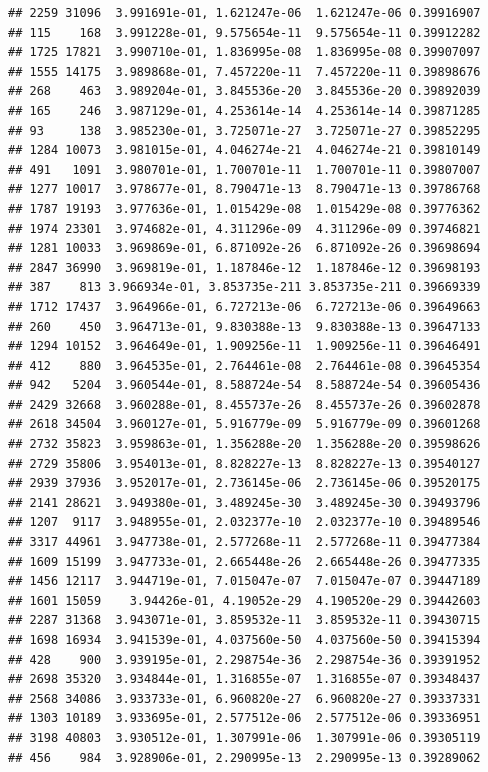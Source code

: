 \documentclass[
]{article}
\begin{document}
\begin{verbatim}
## 2259 31096  3.991691e-01, 1.621247e-06  1.621247e-06 0.39916907
## 115    168  3.991228e-01, 9.575654e-11  9.575654e-11 0.39912282
## 1725 17821  3.990710e-01, 1.836995e-08  1.836995e-08 0.39907097
## 1555 14175  3.989868e-01, 7.457220e-11  7.457220e-11 0.39898676
## 268    463  3.989204e-01, 3.845536e-20  3.845536e-20 0.39892039
## 165    246  3.987129e-01, 4.253614e-14  4.253614e-14 0.39871285
## 93     138  3.985230e-01, 3.725071e-27  3.725071e-27 0.39852295
## 1284 10073  3.981015e-01, 4.046274e-21  4.046274e-21 0.39810149
## 491   1091  3.980701e-01, 1.700701e-11  1.700701e-11 0.39807007
## 1277 10017  3.978677e-01, 8.790471e-13  8.790471e-13 0.39786768
## 1787 19193  3.977636e-01, 1.015429e-08  1.015429e-08 0.39776362
## 1974 23301  3.974682e-01, 4.311296e-09  4.311296e-09 0.39746821
## 1281 10033  3.969869e-01, 6.871092e-26  6.871092e-26 0.39698694
## 2847 36990  3.969819e-01, 1.187846e-12  1.187846e-12 0.39698193
## 387    813 3.966934e-01, 3.853735e-211 3.853735e-211 0.39669339
## 1712 17437  3.964966e-01, 6.727213e-06  6.727213e-06 0.39649663
## 260    450  3.964713e-01, 9.830388e-13  9.830388e-13 0.39647133
## 1294 10152  3.964649e-01, 1.909256e-11  1.909256e-11 0.39646491
## 412    880  3.964535e-01, 2.764461e-08  2.764461e-08 0.39645354
## 942   5204  3.960544e-01, 8.588724e-54  8.588724e-54 0.39605436
## 2429 32668  3.960288e-01, 8.455737e-26  8.455737e-26 0.39602878
## 2618 34504  3.960127e-01, 5.916779e-09  5.916779e-09 0.39601268
## 2732 35823  3.959863e-01, 1.356288e-20  1.356288e-20 0.39598626
## 2729 35806  3.954013e-01, 8.828227e-13  8.828227e-13 0.39540127
## 2939 37936  3.952017e-01, 2.736145e-06  2.736145e-06 0.39520175
## 2141 28621  3.949380e-01, 3.489245e-30  3.489245e-30 0.39493796
## 1207  9117  3.948955e-01, 2.032377e-10  2.032377e-10 0.39489546
## 3317 44961  3.947738e-01, 2.577268e-11  2.577268e-11 0.39477384
## 1609 15199  3.947733e-01, 2.665448e-26  2.665448e-26 0.39477335
## 1456 12117  3.944719e-01, 7.015047e-07  7.015047e-07 0.39447189
## 1601 15059    3.94426e-01, 4.19052e-29  4.190520e-29 0.39442603
## 2287 31368  3.943071e-01, 3.859532e-11  3.859532e-11 0.39430715
## 1698 16934  3.941539e-01, 4.037560e-50  4.037560e-50 0.39415394
## 428    900  3.939195e-01, 2.298754e-36  2.298754e-36 0.39391952
## 2698 35320  3.934844e-01, 1.316855e-07  1.316855e-07 0.39348437
## 2568 34086  3.933733e-01, 6.960820e-27  6.960820e-27 0.39337331
## 1303 10189  3.933695e-01, 2.577512e-06  2.577512e-06 0.39336951
## 3198 40803  3.930512e-01, 1.307991e-06  1.307991e-06 0.39305119
## 456    984  3.928906e-01, 2.290995e-13  2.290995e-13 0.39289062

\end{verbatim}
\end{document}
